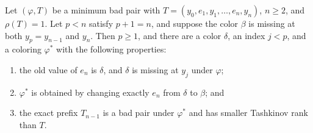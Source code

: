 \begin{helper}
Let \((\varphi,T)\) be a minimum bad pair with
\(T=(y_0,e_1,y_1,\ldots,e_n,y_n)\), \(n\geq2\), and \(\rho(T)=1\).
Let \(p<n\) satisfy \(p+1=n\), and suppose the color \(\beta\) is
missing at both \(y_p=y_{n-1}\) and \(y_n\).  Then \(p\geq1\), and
there are a color \(\delta\), an index \(j<p\), and a coloring
\(\varphi^*\) with the following properties:
\begin{enumerate}
\item the old value of \(e_n\) is \(\delta\), and \(\delta\) is missing
at \(y_j\) under \(\varphi\);
\item \(\varphi^*\) is obtained by changing exactly \(e_n\) from
\(\delta\) to \(\beta\); and
\item the exact prefix \(T_{n-1}\) is a bad pair under \(\varphi^*\)
and has smaller Tashkinov rank than \(T\).
\end{enumerate}
\end{helper}
